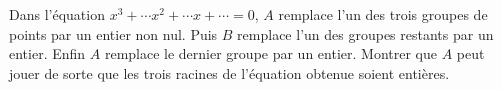 Dans l'équation $x^3 + \cdots x^2 + \cdots x + \cdots = 0$, $A$ remplace l'un des trois groupes de points par un entier non nul. Puis $B$ remplace l'un des groupes restants par un entier. Enfin $A$ remplace le dernier groupe par un entier. Montrer que $A$ peut jouer de sorte que les trois racines de l'équation obtenue soient entières.
